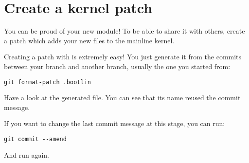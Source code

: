\section{Create a kernel patch}

You can be proud of your new module! To be able to share it with
others, create a patch which adds your new files to the mainline
kernel.

Creating a patch with  is extremely easy! You just generate it
from the commits between your branch and another branch, usually the
one you started from:

\texttt{git format-patch \workingkernel.bootlin}

Have a look at the generated file. You can see that its name reused
the commit message.

If you want to change the last commit message at this stage, you
can run:

\begin{verbatim}
git commit --amend
\end{verbatim}

And run  again.

